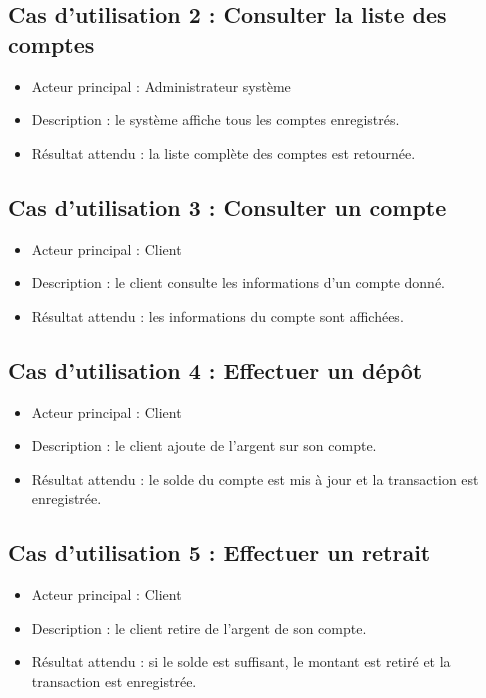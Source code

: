 \documentclass[12pt,a4paper]{article}
\begin{document}
\subsection{Cas d'utilisation 2 : Consulter la liste des comptes}

\begin{itemize}
    \item Acteur principal : Administrateur système
    \item Description : le système affiche tous les comptes enregistrés.
    \item Résultat attendu : la liste complète des comptes est retournée.
\end{itemize}

\subsection{Cas d'utilisation 3 : Consulter un compte}

\begin{itemize}
    \item Acteur principal : Client
    \item Description : le client consulte les informations d'un compte donné.
    \item Résultat attendu : les informations du compte sont affichées.
\end{itemize}

\subsection{Cas d'utilisation 4 : Effectuer un dépôt}

\begin{itemize}
    \item Acteur principal : Client
    \item Description : le client ajoute de l'argent sur son compte.
    \item Résultat attendu : le solde du compte est mis à jour et la transaction est enregistrée.
\end{itemize}

\subsection{Cas d'utilisation 5 : Effectuer un retrait}

\begin{itemize}
    \item Acteur principal : Client
    \item Description : le client retire de l'argent de son compte.
    \item Résultat attendu : si le solde est suffisant, le montant est retiré et la transaction est enregistrée.
\end{itemize}
\end{document}
